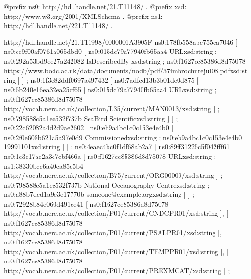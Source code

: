 \documentclass[a4paper,10pt,english]{sphinxmanual}
\begin{document}
\begin{sphinxVerbatim}[commandchars=\\\{\}]
  @prefix ns0: \PYGZlt{}http://hdl.handle.net/21.T11148/\PYGZgt{} .
  @prefix xsd: \PYGZlt{}http://www.w3.org/2001/XMLSchema\PYGZsh{}\PYGZgt{} .
  @prefix ns1: \PYGZlt{}http://hdl.handle.net/221.T11148/\PYGZgt{} .

  \PYGZlt{}http://hdl.handle.net/21.T11998/0000\PYGZhy{}001A\PYGZhy{}3905\PYGZhy{}F\PYGZgt{}
    ns0:178fb558abc755ca7046 [ ns0:ec9f00af0761a065dbd0 [
        ns0:015dc79a77940fb65aa4 \PYGZdq{}URL\PYGZdq{}\PYGZca{}\PYGZca{}xsd:string ;
        ns0:292a53bd9ee27a242082 \PYGZdq{}IsDescribedBy \PYGZdq{}\PYGZca{}\PYGZca{}xsd:string ;
        ns0:f1627ce85386d8d75078 \PYGZdq{}https://www.bodc.ac.uk/data/documents/nodb/pdf/37imbrochurejul08.pdf\PYGZdq{}\PYGZca{}\PYGZca{}xsd:string
      ] ] ;
    ns0:1f3e82ddf0697a497432 [ ns0:7adfcd13b3b01de0d875 [
        ns0:5b240e16ea32ea25cf65 [
          ns0:015dc79a77940fb65aa4 \PYGZdq{}URL\PYGZdq{}\PYGZca{}\PYGZca{}xsd:string ;
          ns0:f1627ce85386d8d75078 \PYGZdq{}http://vocab.nerc.ac.uk/collection/L35/current/MAN0013/\PYGZdq{}\PYGZca{}\PYGZca{}xsd:string
        ] ;
        ns0:798588c5a1ec532f737b \PYGZdq{}Sea\PYGZhy{}Bird Scientific\PYGZdq{}\PYGZca{}\PYGZca{}xsd:string
      ] ] ;
    ns0:22c62082a4d2d9ae2602 [ ns0:eb9a4bc1c0c153e4e4b0 [
        ns0:2f0e608b621a5a97e0d9 \PYGZdq{}Commissioned\PYGZdq{}\PYGZca{}\PYGZca{}xsd:string ;
        ns0:eb9a4bc1c0c153e4e4b0 \PYGZdq{}1999\PYGZhy{}11\PYGZhy{}01\PYGZdq{}\PYGZca{}\PYGZca{}xsd:string
      ] ] ;
    ns0:4eaec4bc0f1df68ab2a7 [ ns0:89ff31225c5f042fff61 [
        ns0:1e3c17ac2a3e7ebf466a [
          ns0:f1627ce85386d8d75078 \PYGZdq{}URL\PYGZdq{}\PYGZca{}\PYGZca{}xsd:string ;
          ns1:38330bcc6a40ca85e5b4 \PYGZdq{}http://vocab.nerc.ac.uk/collection/B75/current/ORG00009/\PYGZdq{}\PYGZca{}\PYGZca{}xsd:string
        ] ;
        ns0:798588c5a1ec532f737b \PYGZdq{}National Oceanography Centre\PYGZdq{}\PYGZca{}\PYGZca{}xsd:string ;
        ns0:a88b7dcd1a9e3e17770b \PYGZdq{}someone@example.org\PYGZdq{}\PYGZca{}\PYGZca{}xsd:string
      ] ] ;
    ns0:72928b84e060d491ee41 [ ns0:f1627ce85386d8d75078 \PYGZdq{}http://vocab.nerc.ac.uk/collection/P01/current/CNDCPR01/\PYGZdq{}\PYGZca{}\PYGZca{}xsd:string ], [ ns0:f1627ce85386d8d75078 \PYGZdq{}http://vocab.nerc.ac.uk/collection/P01/current/PSALPR01/\PYGZdq{}\PYGZca{}\PYGZca{}xsd:string ], [ ns0:f1627ce85386d8d75078 \PYGZdq{}http://vocab.nerc.ac.uk/collection/P01/current/TEMPPR01/\PYGZdq{}\PYGZca{}\PYGZca{}xsd:string ], [ ns0:f1627ce85386d8d75078 \PYGZdq{}http://vocab.nerc.ac.uk/collection/P01/current/PREXMCAT/\PYGZdq{}\PYGZca{}\PYGZca{}xsd:string ] ;

\end{sphinxVerbatim}
\end{document}
